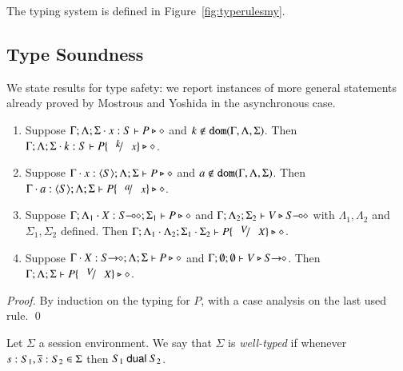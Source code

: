 

The typing system is defined in Figure~\ref{fig:typerulesmy}. 

\subsection{Type Soundness}
We state results for type safety:
we report instances of more general statements already proved by Mostrous and Yoshida in the asynchronous case.

\begin{lemma}
	\begin{enumerate}[1.]
		\item	Suppose $\Gamma; \Lambda; \Sigma \cdot x:S  \vdash P \triangleright \diamond$ and
			$k \not\in \mathtt{dom}(\Gamma, \Lambda, \Sigma)$. 
			Then $\Gamma; \Lambda; \Sigma \cat k:S  \vdash P\subst{k}{x} \hastype \Proc$.

		\item	Suppose $\Gamma \cdot x:\langle S \rangle; \Lambda; \Sigma \vdash P \triangleright \diamond$ and
			$a \not\in \mathtt{dom}(\Gamma, \Lambda, \Sigma)$. 
			Then $\Gamma \cat a:\chtype{S}; \Lambda; \Sigma   \vdash P\subst{a}{x} \hastype \Proc$.

		\item	Suppose $\Gamma; \Lambda_1 \cdot X:S\!\! \multimap\!\! \diamond; \Sigma_1  \vdash P \triangleright \diamond$ 
			and $\Gamma; \Lambda_2; \Sigma_2  \vdash V \triangleright S\!\! \multimap\!\! \diamond$ with 
			$\Lambda_1, \Lambda_2$ and $\Sigma_1, \Sigma_2$ defined.  
			Then $\Gamma; \Lambda_1 \cat \Lambda_2; \Sigma_1 \cat \Sigma_2  \proves P\subst{V}{X} \hastype \Proc$.

		\item	Suppose $\Gamma \cdot X:S\!\! \rightarrow\!\! \diamond; \Lambda; \Sigma  \vdash P \triangleright \diamond$ and
			$\Gamma; \emptyset ; \emptyset  \vdash V \triangleright S\!\! \rightarrow\!\! \diamond$.
			Then $\Gamma; \Lambda; \Sigma  \proves P\subst{V}{X} \hastype \Proc$.
		\end{enumerate}
\end{lemma}

\begin{proof}
By induction on the typing for $P$, with a case analysis on the last used rule. 
\qed
\end{proof}

\begin{definition}
	Let $\Sigma$ a session environment.
	We say that $\Sigma$ is {\em well-typed} if whenever
	$s: S_1, \overline{s}: S_2 \in \Sigma$ then $S_1 \ \mathsf{dual}\  S_2$.
\end{definition}

